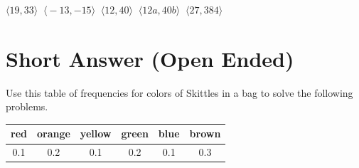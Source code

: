 \documentclass[addpoints]{exam}
\begin{document}
\begin{questions}
    \begin{oneparchoices}
        \choice $\big \langle 19, 33 \big \rangle\ $
        \choice $\big \langle -13, -15 \big \rangle\ $
        \choice $\big \langle 12, 40 \big \rangle\ $
        \choice $\big \langle 12a, 40b \big \rangle\ $
        \choice $\big \langle 27, 384 \big \rangle\ $
        \end{oneparchoices}  \answerline
    \end{questions}
    
\newpage
\section*{Short Answer (Open Ended)}
    \begin{questions}
    \setcounter{question}{25}
    \question[1] Use this table of frequencies for colors of Skittles in a bag to solve the following problems.
    \begin{center}
            \begin{tabular}{ |c|c|c|c|c|c| } 
            \hline
            red & orange & yellow & green & blue & brown \\
            \hline
            0.1 & 0.2 & 0.1 & 0.2 & 0.1 & 0.3 \\
            \hline
            \end{tabular} 
        \end{center}
        
    

\end{questions}
\end{document}
